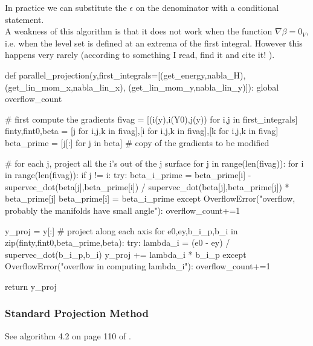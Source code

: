 \documentclass[12pt]{article}
\begin{document}
In practice we can substitute the $\epsilon$ on the denominator with a conditional statement. \\

A weakness of this algorithm is that it does not work when the function $\nabla \beta=0_V$, i.e. when the level set is defined at an extrema of the first integral. However this happens very rarely (according to something I read, find it and cite it! \cite{...}).\\

\begin{python}
def parallel_projection(y,first_integrals=[(get_energy,nabla_H),
                                            (get_lin_mom_x,nabla_lin_x),
                                            (get_lin_mom_y,nabla_lin_y)]):
    global overflow_count
    
    # first compute the gradients
    fivag = [(i(y),i(Y0),j(y)) for i,j in first_integrals]
    finty,fint0,beta = [j for i,j,k in fivag],[i for i,j,k in fivag],[k for i,j,k in fivag]
    beta_prime = [j[:] for j in beta] # copy of the gradients to be modified
    
    
    # for each j, project all the i's out of the j surface
    for j in range(len(fivag)):
        for i in range(len(fivag)):
            if j != i:
                try:
                    beta_i_prime = beta_prime[i] - supervec_dot(beta[j],beta_prime[i]) / supervec_dot(beta[j],beta_prime[j]) * beta_prime[j]
                    beta_prime[i] = beta_i_prime 
                except OverflowError("overflow, probably the manifolds have small angle"):
                    overflow_count+=1 
    
    y_proj = y[:] 
    # project along each axis
    for e0,ey,b_i_p,b_i in zip(finty,fint0,beta_prime,beta):
        try:
            lambda_i = (e0 - ey) / supervec_dot(b_i_p,b_i)
            y_proj += lambda_i * b_i_p 
        except OverflowError("overflow in computing lambda_i"):
            overflow_count+=1
            
    return y_proj
\end{python}

\subsubsection{Standard Projection Method}

See algorithm 4.2 on page 110 of \cite{Numerical}.\\
\end{document}

